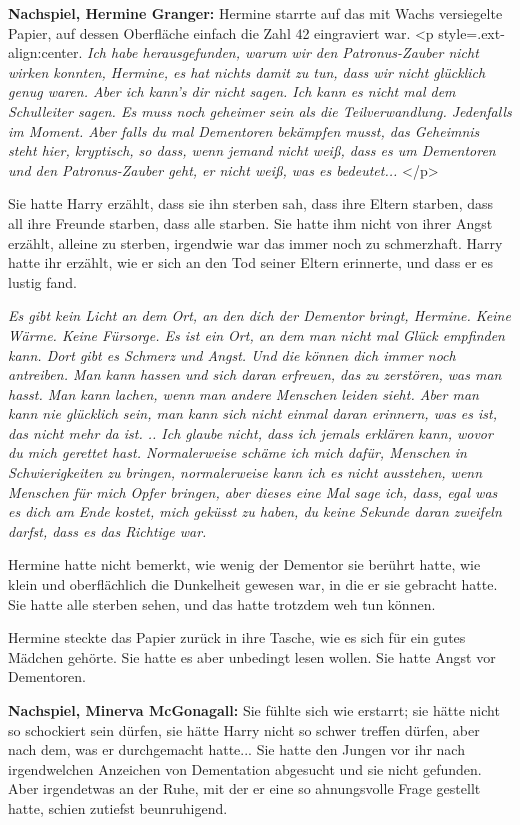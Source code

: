 \textbf{Nachspiel, Hermine Granger:}
Hermine starrte auf das mit Wachs versiegelte Papier, auf dessen Oberfläche
einfach die Zahl 42 eingraviert war. <p style=\grqq{}.ext-align:center\grqq{}.
\emph{Ich habe herausgefunden, warum wir den Patronus-Zauber nicht wirken
konnten, Hermine, es hat nichts damit zu tun, dass wir nicht glücklich genug
waren. Aber ich kann's dir nicht sagen. Ich kann es nicht mal dem Schulleiter
sagen. Es muss noch geheimer sein als die Teilverwandlung. Jedenfalls im Moment.
Aber falls du mal Dementoren bekämpfen musst, das Geheimnis steht hier,
kryptisch, so dass, wenn jemand nicht weiß, dass es um Dementoren und den
Patronus-Zauber geht, er nicht weiß, was es bedeutet...} </p>

Sie hatte Harry erzählt, dass sie ihn sterben sah, dass ihre Eltern starben,
dass all ihre Freunde starben, dass alle starben. Sie hatte ihm nicht von ihrer
Angst erzählt, alleine zu sterben, irgendwie war das immer noch zu schmerzhaft.
Harry hatte ihr erzählt, wie er sich an den Tod seiner Eltern erinnerte, und
dass er es lustig fand.

\emph{Es gibt kein Licht an dem Ort, an den dich der Dementor bringt, Hermine.
Keine Wärme. Keine Fürsorge. Es ist ein Ort, an dem man nicht mal Glück
empfinden kann. Dort gibt es Schmerz und Angst. Und die können dich immer noch
antreiben. Man kann hassen und sich daran erfreuen, das zu zerstören, was man
hasst. Man kann lachen, wenn man andere Menschen leiden sieht. Aber man kann nie
glücklich sein, man kann sich nicht einmal daran erinnern, was es ist, das nicht
mehr da ist. .. Ich glaube nicht, dass ich jemals erklären kann, wovor du mich
gerettet hast. Normalerweise schäme ich mich dafür, Menschen in Schwierigkeiten
zu bringen, normalerweise kann ich es nicht ausstehen, wenn Menschen für mich
Opfer bringen, aber dieses eine Mal sage ich, dass, egal was es dich am Ende
kostet, mich geküsst zu haben, du keine Sekunde daran zweifeln darfst, dass es
das Richtige war.}

Hermine hatte nicht bemerkt, wie wenig der Dementor sie berührt hatte, wie klein
und oberflächlich die Dunkelheit gewesen war, in die er sie gebracht hatte. Sie
hatte alle sterben sehen, und das hatte trotzdem weh tun können.

Hermine steckte das Papier zurück in ihre Tasche, wie es sich für ein gutes
Mädchen gehörte. Sie hatte es aber unbedingt lesen wollen. Sie hatte Angst vor
Dementoren.

\textbf{Nachspiel, Minerva McGonagall:}
Sie fühlte sich wie erstarrt; sie hätte nicht so schockiert sein dürfen, sie
hätte Harry nicht so schwer treffen dürfen, aber nach dem, was er durchgemacht
hatte... Sie hatte den Jungen vor ihr nach irgendwelchen Anzeichen von
Dementation abgesucht und sie nicht gefunden. Aber irgendetwas an der Ruhe, mit
der er eine so ahnungsvolle Frage gestellt hatte, schien zutiefst beunruhigend.


